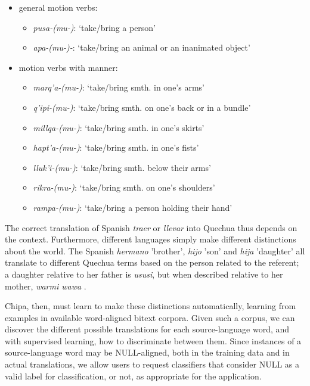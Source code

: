 \begin{itemize}
\renewcommand{\labelitemii}{$\bullet$}
 \small
 \item[] general motion verbs:
 \begin{itemize}
 \item {\em pusa-(mu-)}: `take/bring a person'
 \item {\em apa-(mu-)-}: `take/bring an animal or an inanimated object'
 \end{itemize}
 \item[] motion verbs with manner:
 \begin{itemize}
 \item {\em marq'a-(mu-)}: `take/bring smth. in one's arms'
 \item {\em q'ipi-(mu-)}:  `take/bring smth. on one's back or in a bundle'
 \item {\em millqa-(mu-)}: `take/bring smth. in one's skirts'
 \item {\em hapt'a-(mu-)}: `take/bring smth. in one's fists'
 \item {\em lluk'i-(mu-)}: `take/bring smth. below their arms'
 \item {\em rikra-(mu-)}:  `take/bring smth. on one's shoulders'
 \item {\em rampa-(mu-)}:  `take/bring a person holding their hand'
 \end{itemize}
\end{itemize}

The correct translation of Spanish {\em traer} or {\em llevar} into Quechua
thus depends on the context. Furthermore, different languages simply make
different distinctions about
the world. The Spanish \emph{hermano} 'brother', \emph{hijo} 'son' and
\emph{hija} 'daughter'
all translate to different
Quechua terms based on the person related to the referent; a daughter relative to
her father is \emph{ususi}, but when described relative to her mother,
\emph{warmi wawa} \cite{academiamayor}.

Chipa, then, must learn to make these distinctions automatically, learning from
examples in available word-aligned bitext corpora. Given such a corpus, we can
discover the different possible translations for each source-language word, and
with supervised learning, how to discriminate between them.  Since instances of
a source-language word may be NULL-aligned, both in the training data and in
actual translations, we allow users to request classifiers that consider NULL
as a valid label for classification, or not, as appropriate for the
application.

